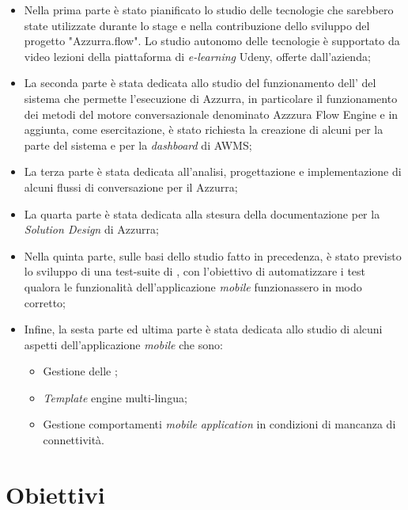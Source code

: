 \begin{itemize}
	\item Nella prima parte è stato pianificato lo studio delle tecnologie che sarebbero state utilizzate durante lo stage e nella contribuzione dello sviluppo del progetto "Azzurra.flow". Lo studio autonomo delle tecnologie è supportato da video lezioni della piattaforma di \emph{e-learning} Udeny, offerte dall'azienda;
	\item La seconda parte è stata dedicata allo studio del funzionamento dell' del sistema che permette l'esecuzione di Azzurra, in particolare il funzionamento dei metodi del motore conversazionale denominato Azzzura Flow Engine e in aggiunta, come esercitazione, è stato richiesta la creazione di alcuni  per la parte  del sistema e per la \emph{dashboard} di \gls{AWMS};
	\item La terza parte è stata dedicata all'analisi, progettazione e implementazione di alcuni flussi di conversazione per il  Azzurra;
	\item La quarta parte è stata dedicata alla stesura della documentazione per la \emph{Solution Design} di Azzurra;
	\item Nella quinta parte, sulle basi dello studio fatto in precedenza, è stato previsto lo sviluppo di una test-suite di , con l'obiettivo di automatizzare i test qualora le funzionalità dell'applicazione \emph{mobile} funzionassero in modo corretto;
	\item Infine, la sesta parte ed ultima parte è stata dedicata allo studio di alcuni aspetti dell'applicazione \emph{mobile} che sono:
		\begin{itemize}
			\item Gestione delle \textcolor{SchoolColor}{\ap{[g]}};
			\item \emph{Template} engine multi-lingua;
			\item Gestione comportamenti \emph{mobile} \emph{application} in condizioni di mancanza di connettività.
		\end{itemize}
\end{itemize}



\section{Obiettivi}

